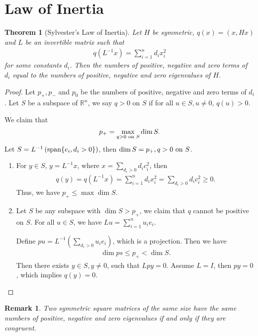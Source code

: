 \documentclass[11pt]{book}
\newtheorem{theorem}{Theorem}[section]
\newtheorem{remark}{Remark}[section]
\theoremstyle{definition}
\numberwithin{equation}{subsection}
\begin{document}
\medskip

\section{Law of Inertia}
\begin{theorem}[Sylvester’s Law of Inertia]
Let $H$ be symmetric, $q(x) = (x, Hx)$ and $L$ be an invertible matrix such that
\begin{align*}
    q\left(L^{-1}x\right) = \sum^n_{i=1} d_i x_i^2
\end{align*}
for some constants $d_i$. Then the numbers of positive, negative and zero terms of $d_i$ equal to the numbers of positive, negative and zero eigenvalues of $H$.
\end{theorem}
\begin{proof}
Let $p_+, p_-$ and $p_0$ be the numbers of positive, negative and zero terms of $d_i$. Let $S$ be a subspace of $\mathbb{R}^n$, we say $q > 0$ on $S$ if for all $u\in S, u\neq 0$, $q(u) > 0$.

We claim that $$p_+ = \max_{q > 0\,\, {\rm on}\,\, S} \dim S. $$
Let $S = L^{-1}\left({\rm span}\{e_i, d_i > 0\} \right)$, then $
\dim S = p_+, q > 0\,\, {\rm on}\,\, S$. 
\begin{enumerate}[label=(\arabic*)]
    \item For $y\in S$, $y = L^{-1}x$, where $x = \sum_{d_i > 0} d_i c_i^2$, then 
    \begin{align*}
        q(y) = q\left(L^{-1}x\right) = \sum^n_{i=1} d_i x_i^2 = \sum_{d_i > 0} d_i c_i^2 \geq 0.
    \end{align*}
    Thus, we have $p_+ \leq \max \dim S$.
    \item Let $S$ be any subspace with $\dim S > p_+$, we claim that $q$ cannot be positive on $S$. For all $u\in S$, we have $Lu = \sum^n_{i=1}u_i e_i$. 
    
    Define $pu = L^{-1}\left(\sum_{d_i>0}u_i e_i \right)$, which is a projection. Then we have
    \begin{align*}
        \dim ps \leq p_+ < \dim S.
    \end{align*}
    Then there exists $y\in S, y\neq 0$, such that $Lpy = 0$. Assume $L = I$, then $py = 0$, which implies $q(y) = 0$. 
\end{enumerate}
\end{proof}

\begin{remark}
Two symmetric square matrices of the same size have the same
numbers of positive, negative and zero eigenvalues if and only if they are congruent.
\end{remark}
\end{document}
